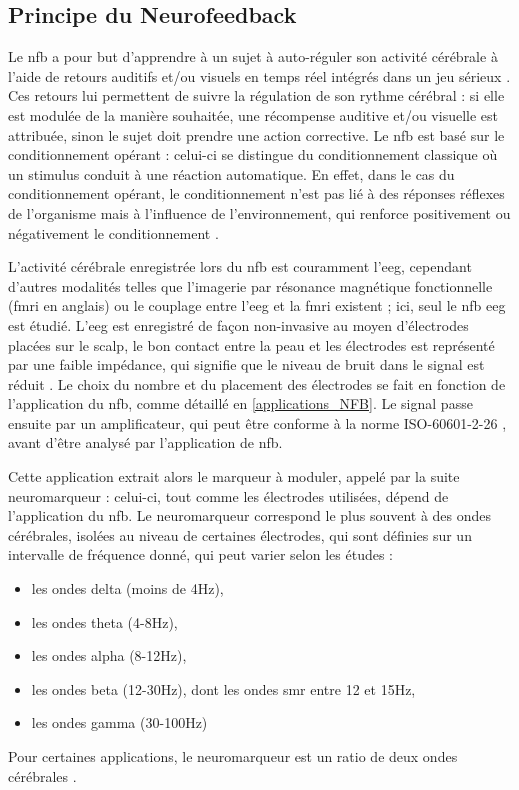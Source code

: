 \subsection{Principe du Neurofeedback} \label{principe_nfb}

Le \gls{nfb} a pour but d'apprendre à un sujet à auto-réguler son activité cérébrale à l'aide de retours auditifs et/ou visuels en temps réel
intégrés dans un jeu sérieux \citep{Wang2010}. Ces retours lui permettent de suivre la régulation de son rythme cérébral : si elle est modulée de 
la manière souhaitée, une récompense auditive et/ou visuelle est attribuée, sinon le sujet doit prendre une action corrective. Le \gls{nfb} 
est basé sur le conditionnement opérant \citep{Reynolds1975} : celui-ci se distingue du conditionnement classique où un stimulus conduit à 
une réaction automatique. En effet, dans le cas du conditionnement opérant, le conditionnement n'est pas lié à des réponses réflexes de
l'organisme mais à l'influence de l'environnement, qui renforce positivement ou négativement le conditionnement \citep{Skinner1948}. 

L'activité cérébrale enregistrée lors du \gls{nfb} est couramment l'\gls{eeg}, cependant d'autres modalités telles que l'imagerie par résonance 
magnétique fonctionnelle (\gls{fmri} en anglais) \citep{Sulzer2013} ou le couplage entre l'\gls{eeg} et la \gls{fmri} \citep{Perronnet2017} existent ; ici,
seul le \gls{nfb} \gls{eeg} est étudié. L'\gls{eeg} est enregistré de façon non-invasive au moyen d'électrodes placées sur le scalp, 
le bon contact entre la peau et les électrodes est représenté par une faible impédance, qui signifie que le niveau de bruit dans le 
signal est réduit \citep{Kappenman2010}. Le choix du nombre et du placement des électrodes se fait en fonction de l'application du \gls{nfb}, comme détaillé en 
\ref{applications_NFB}. Le signal passe ensuite par un amplificateur, qui peut être conforme à la norme ISO-60601-2-26 \citep{ISO}, avant d'être analysé 
par l'application de \gls{nfb}. 

Cette application extrait alors le marqueur à moduler, appelé par la suite neuromarqueur : celui-ci, tout comme les électrodes utilisées, 
dépend de l'application du \gls{nfb}. Le neuromarqueur correspond le plus souvent à des ondes cérébrales, isolées au niveau de certaines électrodes,
qui sont définies sur un intervalle de fréquence donné, qui peut varier selon les études \citep{Marzbani2016} :
\renewcommand{\labelitemi}{$\bullet$}
\renewcommand{\labelitemii}{$\cdot$}
\begin{itemize}
\item les ondes delta (moins de 4Hz),
\item les ondes theta (4-8Hz),
\item les ondes alpha (8-12Hz),
\item les ondes beta (12-30Hz), dont les ondes \gls{smr} entre 12 et 15Hz,
\item les ondes gamma (30-100Hz)
\end{itemize}
Pour certaines applications, le neuromarqueur est un ratio de deux ondes cérébrales \citep{Gevensleben2009}.


